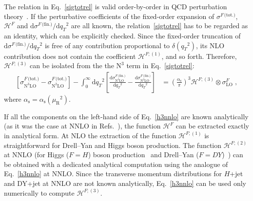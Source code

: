 \documentclass[12pt]{article}
\DeclareRobustCommand{\nn}{\nonumber}
\DeclareRobustCommand{\alphas}{\ensuremath{\alpha_{\mathrm{s}}}\xspace}
\DeclareRobustCommand{\as}{\alphas}
\DeclareRobustCommand{\asOpi}{\ensuremath{\left(\frac{\as}{\pi}\right)}} %
\DeclareRobustCommand{\mur}{\ensuremath{\mu_{\mathrm{R}}}\xspace}
\DeclareRobustCommand{\muR}{\mur}
\DeclareRobustCommand{\muf}{\ensuremath{\mu_{\mathrm{F}}}\xspace}
\DeclareRobustCommand{\qt}{\ensuremath{q_T}\xspace}
\DeclareRobustCommand{\rd}{\ensuremath{\mathrm{d}}}
\DeclareRobustCommand{\cH}{\ensuremath{\mathcal{H}}}
\DeclareRobustCommand{\fin}{\text{(fin.)}\xspace}
\DeclareRobustCommand{\tot}{\text{(tot.)}\xspace}
\DeclareRobustCommand{\LO}{\text{LO}\xspace}
\DeclareRobustCommand{\N}[1]{\ensuremath{\text{N}^{#1}}} %
\begin{document}
The relation in Eq.~\eqref{sigtotrel} is valid order-by-order in QCD perturbation theory~\cite{Bozzi:2005wk}. If the perturbative coefficients of the fixed-order expansion of $\sigma^{F\,\tot}$, $\cH^F$ and $\rd \sigma^{F\,\fin}/\rd \qt^2$ are all known, the relation~\eqref{sigtotrel} has to be regarded as an identity, which can be explicitly checked. Since the fixed-order truncation of $\rd \sigma^{F\,\fin}/\rd \qt^2$ is free of any contribution proportional to $\delta(\qt^2)$, its NLO contribution  does not contain the coefficient $\cH^{F;(1)}$, and so forth. 
Therefore, $\cH^{F;(3)}$ can be isolated from the  the  \N3\LO  term in Eq.~\eqref{sigtotrel}:
\begin{align}
  \left[
    \sigma^{F\,\tot}_{\N3\LO} - 
    \sigma^{F\,\tot}_{\N2\LO}
  \right] -
  \int_0^\infty\rd\qt^2 \left[
    \frac{\rd\sigma^{F\,\fin}_{\N3\LO}}{\rd\qt^2} -
    \frac{\rd\sigma^{F\,\fin}_{\N2\LO}}{\rd\qt^2}
  \right]
  &=
  \asOpi^3 \cH^{F;(3)} \otimes \sigma^F_{\LO} \;,
  \label{h3nnlo}
\end{align}
where $\as=\as(\muR^2)$.

If all the components on the left-hand side of Eq.~\eqref{h3nnlo} are known analytically (as it was the case at NNLO in Refs.~\cite{Catani:2011kr,Catani:2012qa}), the function $\cH^{F}$ can be extracted exactly in analytical form. At NLO the extraction of the function  $\cH^{F;(1)}$ is straightforward for Drell--Yan and Higgs boson production. The function $\cH^{F;(2)}$ at NNLO (for Higgs ($F=H$) boson production~\cite{Catani:2011kr} and Drell--Yan ($F=DY$)~\cite{Catani:2012qa}) can be obtained with a dedicated analytical computation using the analogue of Eq.~\eqref{h3nnlo} at NNLO. Since the transverse momentum distributions for $H$+jet and DY+jet at NNLO are not known analytically, Eq.~\eqref{h3nnlo} can be used only numerically to compute $\cH^{F;(3)}$. 
\end{document}
